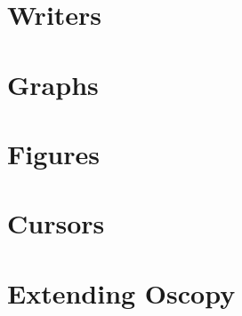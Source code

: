 \documentclass[a4paper,11pt]{article}
\begin{document}
\section{Writers}
\label{sec:writers}

\section{Graphs}
\label{sec:graphs}

\section{Figures}
\label{sec:figs}

\section{Cursors}
\label{sec:curs}

\section{Extending Oscopy}
\label{sec:ext}
\end{document}

